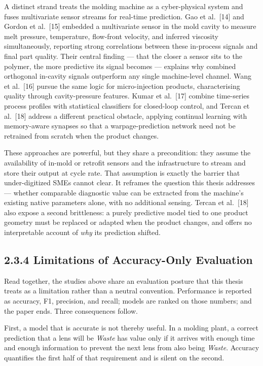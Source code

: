 A distinct strand treats the molding machine as a cyber-physical system and fuses multivariate sensor streams for real-time prediction. Gao et al.~{[}14{]} and Gordon et al.~{[}15{]} embedded a multivariate sensor in the mold cavity to measure melt pressure, temperature, flow-front velocity, and inferred viscosity simultaneously, reporting strong correlations between these in-process signals and final part quality. Their central finding --- that the closer a sensor sits to the polymer, the more predictive its signal becomes --- explains why combined orthogonal in-cavity signals outperform any single machine-level channel. Wang et al.~{[}16{]} pursue the same logic for micro-injection products, characterising quality through cavity-pressure features. Kumar et al.~{[}17{]} combine time-series process profiles with statistical classifiers for closed-loop control, and Tercan et al.~{[}18{]} address a different practical obstacle, applying continual learning with memory-aware synapses so that a warpage-prediction network need not be retrained from scratch when the product changes.

These approaches are powerful, but they share a precondition: they assume the availability of in-mold or retrofit sensors and the infrastructure to stream and store their output at cycle rate. That assumption is exactly the barrier that under-digitized SMEs cannot clear. It reframes the question this thesis addresses --- whether comparable diagnostic value can be extracted from the machine's existing native parameters alone, with no additional sensing. Tercan et al.~{[}18{]} also expose a second brittleness: a purely predictive model tied to one product geometry must be replaced or adapted when the product changes, and offers no interpretable account of \emph{why} its prediction shifted.

\hypertarget{limitations-of-accuracy-only-evaluation}{%
\subsection{2.3.4 Limitations of Accuracy-Only Evaluation}\label{limitations-of-accuracy-only-evaluation}}

Read together, the studies above share an evaluation posture that this thesis treats as a limitation rather than a neutral convention. Performance is reported as accuracy, F1, precision, and recall; models are ranked on those numbers; and the paper ends. Three consequences follow.

First, a model that is accurate is not thereby useful. In a molding plant, a correct prediction that a lens will be \emph{Waste} has value only if it arrives with enough time and enough information to prevent the next lens from also being \emph{Waste}. Accuracy quantifies the first half of that requirement and is silent on the second.

